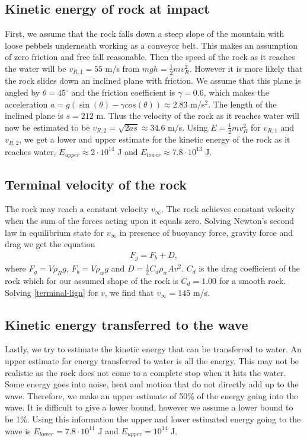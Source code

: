 \documentclass[11pt]{article}
\begin{document}
\subsection{Kinetic energy of rock at impact}
First, we assume that the rock falls down a steep slope of the mountain with loose pebbels underneath working as a conveyor belt. This makes an assumption of zero friction and free fall reasonable.
Then the speed of the rock as it reaches the water will be $v_{R,1}=55$ m/s from $mgh=\frac{1}{2}mv_R^2$. However it is more likely that the rock slides down an inclined plane with friction.
We assume that this plane is angled by $\theta=45^{\circ}$  and the friction coefficient is $\gamma=0.6$, which makes the acceleration $a=g(\sin(\theta) - \gamma cos(\theta)) \approx 2.83$ m/s$^2$.
The length of the inclined plane is $s=212$ m. Thus the velocity of the rock as it reaches water will now be estimated to be $v_{R,2}=\sqrt{2as} \approx 34.6$ m/s.
Using $E =\frac{1}{2}m v_R^2$ for $v_{R,1}$ and $v_{R,2}$, we get a lower and upper estimate for the kinetic energy of the rock as it reaches water, $E_{upper} \approx 2 \cdot 10^{14}$ J and $E_{lower} \approx 7.8 \cdot 10^{13}$ J.

\subsection{Terminal velocity of the rock}
The rock may reach a constant velocity $v_{\infty}$. The rock achieves constant velocity when the sum of the forces acting upon it equals zero. Solving Newton's second law in equilibrium state for
$v_{\infty}$ in presence of buoyancy force, gravity force and drag we get the equation
\begin{align}
    \label{terminal-lign}
    F_g=F_b + D,
\end{align}
where $F_g=V\rho_{R}g$, $F_b= V \rho_{w}g$ and $D=\frac{1}{2}C_d\rho_{w}Av^2$. $C_d$ is the drag coefficient of the rock which for our assumed shape of the rock is $C_d=1.00$ for a smooth rock.
Solving \eqref{terminal-lign} for $v$, we find that $v_{\infty} = 145$ m/s. 

\subsection{Kinetic energy transferred to the wave}
Lastly, we try to estimate the kinetic energy that can be transferred to water. An upper estimate for energy transferred to water is all the energy. This may not be realistic as the rock does not
come to a complete stop when it hits the water. Some energy goes into noise, heat and motion that do not directly add up to the wave. Therefore, we make an upper estimate of 50\% of the energy going into the wave.
It is difficult to give a lower bound, however we assume a lower bound to be 1\%. Using this information the upper and lower estimated energy going to the wave is $E_{lower}=7.8 \cdot 10^{11}$ J and $E_{upper}=10^{14}$ J.
\end{document}
